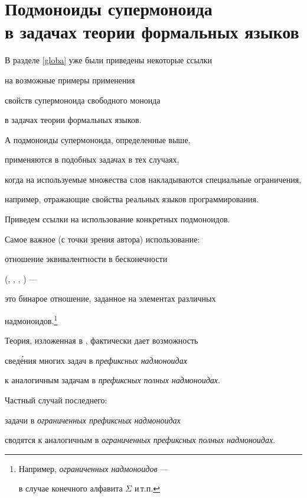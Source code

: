  \section{Подмоноиды супермоноида\protect\\


 в задачах теории формальных языков}


 \label{use}





 В разделе \ref{globa} уже были приведены некоторые ссылки


 на возможные примеры применения


 свойств супермоноида свободного моноида


 в задачах теории формальных языков.


 А подмоноиды супермоноида, определенные выше,


 применяются в подобных задачах в тех случаях,


 когда на используемые множества слов накладываются специальные ограничения,


 например, отражающие свойства реальных языков программирования.


 Приведем ссылки на использование конкретных подмоноидов.





 Самое важное (с точки зрения автора) использование:


 отношение эквивалентности в бесконечности


 (\cite{io13}, \cite{medu}, \cite{io7}, \cite{io9}) ---


 это бинарое отношение, заданное на элементах различных 


надмоноидов.\footnote{Например, {\it ограниченных надмоноидов\/} ---


 в случае конечного алфавита $\Sigma$ и\,т.п.}


 Теория, изложенная в \cite{medu}, фактически дает возможность


 свед\'ения многих задач в {\it префиксных надмоноидах\/}


 к аналогичным задачам в {\it префиксных полных надмоноидах\/}.


 Частный случай последнего:


 задачи в {\it ограниченных префиксных надмоноидах\/}


 сводятся к аналогичным в {\it ограниченных префиксных полных надмоноидах\/}.


